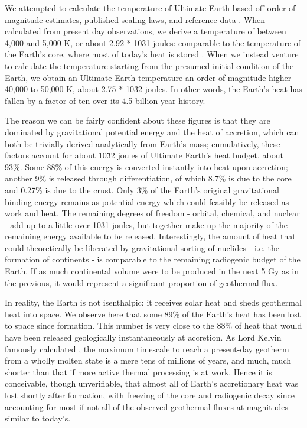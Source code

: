 \documentclass[a4paper,11pt,oneside]{book}
\begin{document}
We attempted to calculate the temperature of Ultimate Earth based off order-of-magnitude estimates, published scaling laws, and reference data \citet{Dziewonski1981-if, Lodders1998-dj, Sleep2000-wa, Korenaga2003-oy, De_Pater2015-sq, Zeng2016-pt}. When calculated from present day observations, we derive a temperature of between 4,000 and 5,000 K, or about  2.92 * 10\^31 joules: comparable to the temperature of the Earth's core, where most of today's heat is stored \cite{Jaupart2010-zy}. When we instead venture to calculate the temperature starting from the presumed initial condition of the Earth, we obtain an Ultimate Earth temperature an order of magnitude higher - 40,000 to 50,000 K, about 2.75 * 10\^32 joules. In other words, the Earth's heat has fallen by a factor of ten over its 4.5 billion year history.

The reason we can be fairly confident about these figures is that they are dominated by gravitational potential energy and the heat of accretion, which can both be trivially derived analytically from Earth's mass; cumulatively, these factors account for about 10\^32 joules of Ultimate Earth's heat budget, about 93\%. Some 88\% of this energy is converted instantly into heat upon accretion; another 9\% is released through differentiation, of which 8.7\% is due to the core and 0.27\% is due to the crust. Only 3\% of the Earth's original gravitational binding energy remains as potential energy which could feasibly be released as work and heat. The remaining degrees of freedom - orbital, chemical, and nuclear - add up to a little over 10\^31 joules, but together make up the majority of the remaining energy available to be released. Interestingly, the amount of heat that could theoretically be liberated by gravitational sorting of nuclides - i.e. the formation of continents - is comparable to the remaining radiogenic budget of the Earth. If as much continental volume were to be produced in the next 5 Gy as in the previous, it would represent a significant proportion of geothermal flux.

In reality, the Earth is not isenthalpic: it receives solar heat and sheds geothermal heat into space. We observe here that some 89\% of the Earth's heat has been lost to space since formation. This number is very close to the 88\% of heat that would have been released geologically instantaneously at accretion. As Lord Kelvin famously calculated \cite{Thomson1862-kb}, the maximum timescale to reach a present-day geotherm from a wholly molten state is a mere tens of millions of years, and much, much shorter than that if more active thermal processing is at work. Hence it is conceivable, though unverifiable, that almost all of Earth's accretionary heat was lost shortly after formation, with freezing of the core and radiogenic decay since accounting for most if not all of the observed geothermal fluxes at magnitudes similar to today's.
\end{document}
